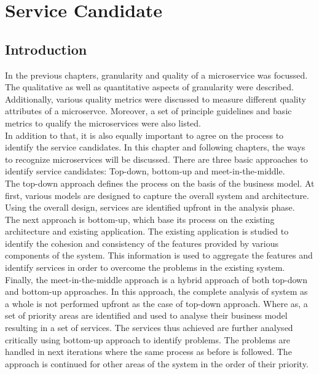 \chapter{Service Candidate}\label{chapter:service_candidate}

\section{Introduction}\label{section:service_candidate/introduction}
In the previous chapters, granularity and quality of a microservice was focussed. The qualitative as well as quantitative aspects of granularity were described. Additionally, various quality metrics were discussed to measure different quality attributes of a microservce. Moreover, a set of principle guidelines and basic metrics to qualify the microservices were also listed.\\
In addition to that, it is also equally important to agree on the process to identify the service candidates. In this chapter and following chapters, the ways to recognize microservices will be discussed.
There are three basic approaches to identify service candidates: Top-down, bottom-up and meet-in-the-middle. \\
The top-down approach defines the process on the basis of the business model. At first, various models are designed to capture the overall system and architecture. Using the overall design, services are identified upfront in the analysis phase.\\
The next approach is bottom-up, which base its process on the existing architecture and existing application. The existing application is studied to identify the cohesion and consistency of the features provided by various components of the system. This information is used to aggregate the features and identify services in order to overcome the problems in the existing system.\\
Finally, the meet-in-the-middle approach is a hybrid approach of both top-down and bottom-up approaches. In this approach, the complete analysis of system as a whole is not performed upfront as the case of top-down approach. Where as, a set of priority areas are identified and used to analyse their business model resulting in a set of services. The services thus achieved are further analysed critically using bottom-up approach to identify problems. The problems are handled in next iterations where the same process as before is followed. The approach is continued for other areas of the system in the order of their priority.\cite{Pierre-Reldin:2007aa}\cite{Arsanjani:2004aa}

